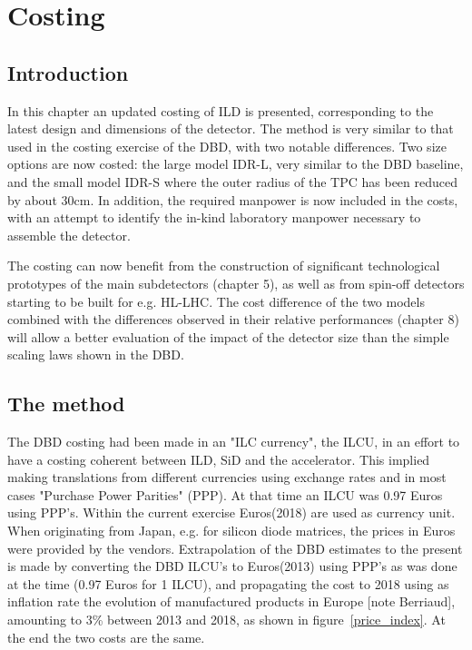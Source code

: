 \chapter{Costing}
\section{Introduction}
In this chapter an updated costing of ILD is presented, corresponding to the latest design and dimensions of the detector. The method is very similar to that used in the costing exercise of the DBD, with two notable differences. Two size options are now costed: the large model IDR-L, very similar to the DBD baseline, and the small model IDR-S where the outer radius of the TPC has been reduced by about 30cm. In addition, the required manpower is now included in the costs, with an attempt to identify the in-kind laboratory manpower necessary to assemble the detector. 

The costing can now benefit from the construction of significant technological prototypes of the main subdetectors (chapter 5), as well as from spin-off detectors starting to be built for e.g. HL-LHC. The cost difference of the two models combined with the differences observed in their relative performances (chapter 8) will allow a better evaluation of the impact of the detector size than the simple scaling laws shown in the DBD. 

\section{The method}
The DBD costing had been made in an "ILC currency", the ILCU, in an effort to have a costing coherent between ILD, SiD and the accelerator. This implied making translations from different currencies using exchange rates and in most cases "Purchase Power Parities" (PPP). At that time an ILCU was 0.97 Euros using PPP's. Within the current exercise Euros(2018) are used as currency unit. When originating from Japan, e.g. for silicon diode matrices, the prices in Euros were provided by the vendors. Extrapolation of the DBD estimates to the present is made by converting the DBD ILCU's to Euros(2013) using PPP's as was done at the time (0.97 Euros for 1 ILCU), and propagating the cost to 2018 using as inflation rate the evolution of manufactured products in Europe [note Berriaud], amounting to 3\% between 2013 and 2018, as shown in figure~\ref{price_index}. At the end the two costs are the same. 

